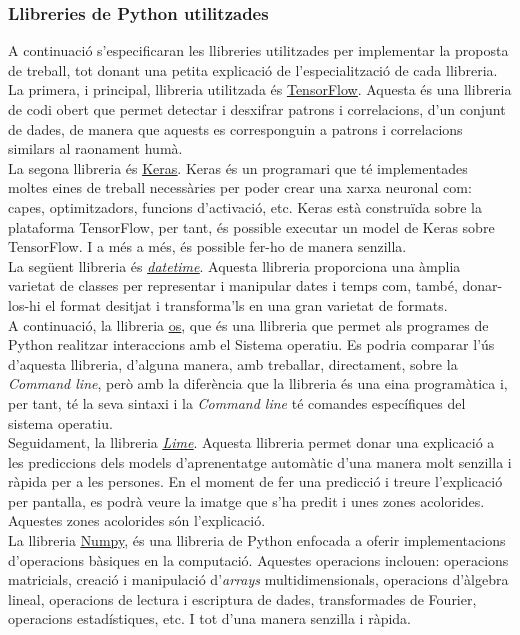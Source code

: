 \documentclass[a4paper,12pt]{article}
\begin{document}
\subsubsection*{Llibreries de Python utilitzades}
A continuació s'especificaran les llibreries utilitzades per implementar la proposta de treball, tot donant una petita explicació de l'especialització de cada llibreria.\\
La primera, i principal, llibreria utilitzada és \href{https://www.tensorflow.org/?hl=es-419}{\underline{TensorFlow}}. Aquesta és una llibreria de codi obert que permet detectar i desxifrar patrons i correlacions, d'un conjunt de dades, de manera que aquests es corresponguin a patrons i correlacions similars al raonament humà.\\
La segona llibreria és \href{https://keras.io}{\underline{Keras}}. Keras és un programari que té implementades moltes eines de treball necessàries per poder crear una xarxa neuronal com: capes, optimitzadors, funcions d'activació, etc. Keras està construïda sobre la plataforma TensorFlow, per tant, és possible executar un model de Keras sobre TensorFlow. I a més a més, és possible fer-ho de manera senzilla.\\
La següent llibreria és \href{https://docs.python.org/3/library/datetime.html}{\underline{\textit{datetime}}}. Aquesta llibreria proporciona una àmplia varietat de classes per representar i manipular dates i temps com, també, donar-los-hi el format desitjat i transforma'ls en una gran varietat de formats.\\
A continuació, la llibreria \href{https://docs.python.org/3/library/os.html}{\underline{os}}, que és una llibreria que permet als programes de Python realitzar interaccions amb el Sistema operatiu. Es podria comparar l'ús d'aquesta llibreria, d'alguna manera, amb treballar, directament, sobre la \textit{Command line}, però amb la diferència que la llibreria és una eina programàtica i, per tant, té la seva sintaxi i la \textit{Command line} té comandes específiques del sistema operatiu.\\
Seguidament, la llibreria \href{https://lime-ml.readthedocs.io/en/latest/}{\underline{\textit{Lime}}}. Aquesta llibreria permet donar una explicació a les prediccions dels models d'aprenentatge automàtic d'una manera molt senzilla i ràpida per a les persones. En el moment de fer una predicció i treure l'explicació per pantalla, es podrà veure la imatge que s'ha predit i unes zones acolorides. Aquestes zones acolorides són l'explicació.\\
La llibreria \href{https://numpy.org}{\underline{Numpy}}, és una llibreria de Python enfocada a oferir implementacions d'operacions bàsiques en la computació. Aquestes operacions inclouen: operacions matricials, creació i manipulació d'\textit{arrays} multidimensionals, operacions d'àlgebra lineal, operacions de lectura i escriptura de dades, transformades de Fourier, operacions estadístiques, etc. I tot d'una manera senzilla i ràpida.
\end{document}
